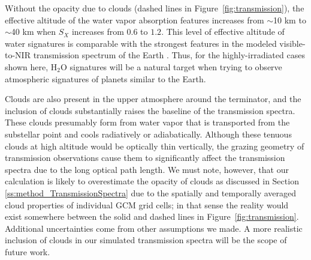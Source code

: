 \documentclass[11pt,numberedappendix,twocolappendix,]{emulateapj}
\def\water{H$_2$O}
\begin{document}
Without the opacity due to clouds (dashed lines in Figure~\ref{fig:transmission}), the effective altitude of the water vapor absorption features increases from $\sim $10 km to $\sim $40 km when $S_X$ increases from $0.6$ to $1.2$. 
This level of effective altitude of water signatures is comparable with the strongest features in the modeled visible-to-NIR transmission spectrum of the Earth \citep[e.g.,][]{Kaltenegger2009}.
Thus, for the highly-irradiated cases shown here, \water{} signatures will be a natural target when trying to observe atmospheric signatures of planets similar to the Earth. 

Clouds are also present in the upper atmosphere around the terminator, and the inclusion of clouds substantially raises the baseline of the transmission spectra. 
These clouds presumably form from water vapor that is transported from the substellar point and cools radiatively or adiabatically. 
Although these tenuous clouds at high altitude would be optically thin vertically, the grazing geometry of transmission observations cause them to significantly affect the transmission spectra due to the long optical path length. 
We must note, however, that our calculation is likely to overestimate the opacity of clouds as discussed in Section \ref{ss:method_TransmissionSpectra} due to the spatially and temporally averaged cloud properties of individual GCM grid cells; 
in that sense the reality would exist somewhere between the solid and dashed lines in Figure~\ref{fig:transmission}.
Additional uncertainties come from other assumptions we made. 
A more realistic inclusion of clouds in our simulated transmission spectra will be the scope of future work. 
\end{document}
